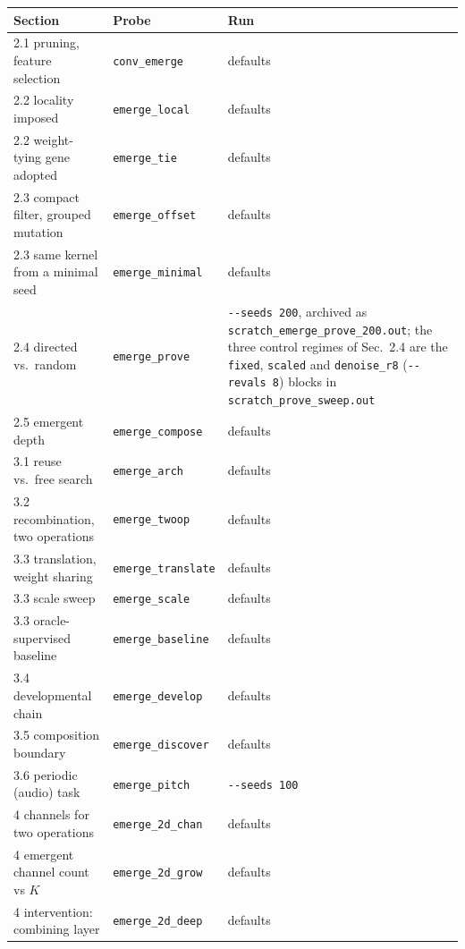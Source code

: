 \documentclass[11pt]{article}
\begin{document}
\begin{table}[ht]
\centering\small
\begin{tabular}{@{}llp{}@{}}
\toprule
Section & Probe & Run \\
\midrule
2.1 pruning, feature selection      & \texttt{conv\_emerge}     & defaults \\
2.2 locality imposed                & \texttt{emerge\_local}    & defaults \\
2.2 weight-tying gene adopted       & \texttt{emerge\_tie}      & defaults \\
2.3 compact filter, grouped mutation& \texttt{emerge\_offset}   & defaults \\
2.3 same kernel from a minimal seed & \texttt{emerge\_minimal}  & defaults \\
2.4 directed vs.\ random            & \texttt{emerge\_prove}    & \texttt{-{}-seeds 200}, archived as \texttt{scratch\_emerge\_prove\_200.out}; the three control regimes of Sec.~2.4 are the \texttt{fixed}, \texttt{scaled} and \texttt{denoise\_r8} (\texttt{-{}-revals 8}) blocks in \texttt{scratch\_prove\_sweep.out} \\
2.5 emergent depth                  & \texttt{emerge\_compose}  & defaults \\
3.1 reuse vs.\ free search          & \texttt{emerge\_arch}     & defaults \\
3.2 recombination, two operations   & \texttt{emerge\_twoop}    & defaults \\
3.3 translation, weight sharing     & \texttt{emerge\_translate}& defaults \\
3.3 scale sweep                     & \texttt{emerge\_scale}    & defaults \\
3.3 oracle-supervised baseline      & \texttt{emerge\_baseline} & defaults \\
3.4 developmental chain             & \texttt{emerge\_develop}  & defaults \\
3.5 composition boundary            & \texttt{emerge\_discover} & defaults \\
3.6 periodic (audio) task           & \texttt{emerge\_pitch}    & \texttt{-{}-seeds 100} \\
4 channels for two operations       & \texttt{emerge\_2d\_chan}  & defaults \\
4 emergent channel count vs $K$     & \texttt{emerge\_2d\_grow}  & defaults \\
4 intervention: combining layer     & \texttt{emerge\_2d\_deep}  & defaults \\

\end{tabular}
\end{table}
\end{document}

